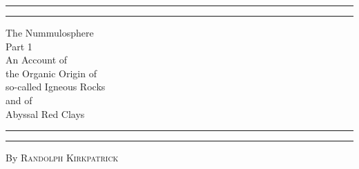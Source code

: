 \documentclass[a4paper, 12pt, oneside]{article}
\begin{document}
\begin{titlepage} %
	\centering %
	\scshape %

	
	\rule{\textwidth}{1.6pt}\vspace*{-\baselineskip}\vspace*{2pt} %
	\rule{\textwidth}{0.4pt} %
	
	\vspace{0.75\baselineskip} %

        {\LARGE The Nummulosphere\\ Part 1\\ An Account of \\ the Organic Origin of\\ so-called Igneous Rocks\\ and of\\ Abyssal Red Clays \\} %
	
	\vspace{0.75\baselineskip} %
	
	\rule{\textwidth}{0.4pt}\vspace*{-\baselineskip}\vspace{3.2pt} %
	\rule{\textwidth}{1.6pt} %
	
	\vspace{1\baselineskip} %
	
	
	{By \scshape\Large Randolph Kirkpatrick\\} %
	
	\vspace*{1\baselineskip} %
	
	
	\vspace{1\baselineskip} %

	

\end{titlepage}
\end{document}
